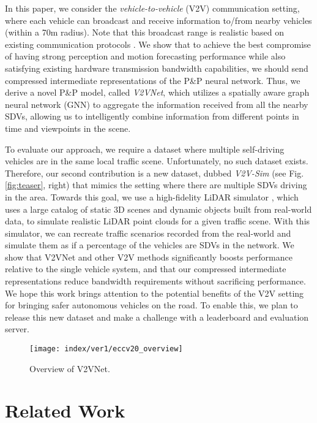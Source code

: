 \documentclass[runningheads]{llncs}
\newcommand{\pnp}{P\&P}
\begin{document}
In this paper, we consider the \textit{vehicle-to-vehicle} (V2V) 
communication 
setting, where each vehicle can broadcast and receive information
to/from nearby vehicles (within a 70m radius). 
Note that this broadcast range is realistic based on existing communication protocols \cite{kenney2011dsrc}. 
We show that to achieve the best compromise of having strong perception and motion forecasting performance while also satisfying existing hardware transmission bandwidth capabilities, we should send compressed intermediate representations of the \pnp { } neural network. 
Thus, we derive a novel \pnp {} model, called {\it V2VNet}, which utilizes a spatially aware graph neural network (GNN) to aggregate the information received from all the nearby SDVs,  allowing us to intelligently combine information from different points in time and viewpoints in the scene. 

To evaluate our approach, we require a dataset where multiple self-driving vehicles are in the same local traffic scene. Unfortunately, no such dataset exists.
Therefore, our second contribution is a new dataset, dubbed {\it V2V-Sim} (see Fig. \ref{fig:teaser}, right) that mimics the setting where there are multiple SDVs driving in the area.
Towards this goal, we use a high-fidelity LiDAR simulator \cite{siva2019lidarsim}, which uses a large catalog of  static 3D scenes and dynamic objects built from real-world data,
to simulate realistic LiDAR point clouds for a given traffic scene.
With this simulator, we can recreate traffic scenarios recorded from the real-world and simulate them as if a percentage of the vehicles are SDVs in the network.
We show that V2VNet and other V2V methods significantly boosts 
performance relative to the single vehicle system, and that our compressed intermediate representations reduce bandwidth requirements without sacrificing performance.
We hope this work brings attention to the potential benefits of the V2V setting 
for bringing safer autonomous vehicles on the road. 
To enable this, we plan to release this new dataset and make a challenge with a leaderboard and evaluation server.

\begin{figure*}[t]
  \centering
  \texttt{[image: index/ver1/eccv20\_overview]}
  \caption{Overview of V2VNet.}
  \label{fig:overview}
 \end{figure*}
 
\section{Related Work}
\end{document}
